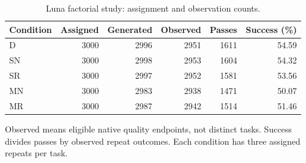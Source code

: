 \begin{table}[t]\centering
\caption{Luna factorial study: assignment and observation counts.}
\label{tab:scale-quality}
\begin{tabular}{lrrrrr}\toprule
Condition & Assigned & Generated & Observed & Passes & Success (\%)\\\midrule
D & 3000 & 2996 & 2951 & 1611 & 54.59\\
SN & 3000 & 2998 & 2953 & 1604 & 54.32\\
SR & 3000 & 2997 & 2952 & 1581 & 53.56\\
MN & 3000 & 2983 & 2938 & 1471 & 50.07\\
MR & 3000 & 2987 & 2942 & 1514 & 51.46\\
\bottomrule\end{tabular}
\par\smallskip\noindent Observed means eligible native quality endpoints, not distinct tasks. Success divides passes by observed repeat outcomes. Each condition has three assigned repeats per task.
\end{table}
